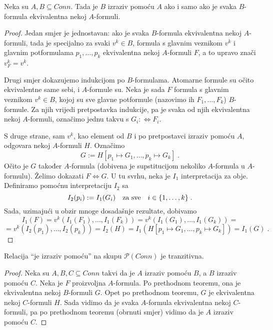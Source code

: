 \begin{teorem}
	Neka su $A, B\subseteq Conn$. Tada je $B$ izraziv pomoću $A$ ako i samo ako je svaka $B$-formula ekvivalentna nekoj $A$-formuli.
\end{teorem}

\begin{proof}
	Jedan smjer je jednostavan: ako je svaka $B$-formula ekvivalentna nekoj $A$-formuli, tada je specijalno za svaki $v^k\in B$, formula s glavnim veznikom $v^k$ i glavnim potformulama $p_1,\ldots,p_k$ ekvivalentna nekoj $A$-formuli $F$, a to upravo znači $v^k_F=v^k$.
	
	Drugi smjer dokazujemo indukcijom po $B$-formulama. Atomarne formule su očito ekvivalentne same sebi, i $A$-formule su. Neka je sada $F$ formula s glavnim veznikom $v^k\in B$, kojoj su sve glavne potformule (nazovimo ih $F_1,\ldots,F_k$) $B$-formule. Za njih vrijedi pretpostavka indukcije, pa je svaka od njih ekvivalentna nekoj $A$-formuli, označimo jednu takvu s $G_i:\Leftrightarrow F_i$.
	
	S druge strane, sam $v^k$, kao element od $B$ i po pretpostavci izraziv pomoću $A$, odgovara nekoj $A$-formuli $H$. Označimo $$G:=H[p_1\mapsto G_1,\ldots,p_k\mapsto G_k]\;.$$
	Očito je $G$ također $A$-formula (dobivena je supstitucijom nekoliko $A$-formula u $A$-formulu). Želimo dokazati $F\Leftrightarrow G$. U tu svrhu, neka je $I_1$ interpretacija za obje. Definiramo pomoćnu interpretaciju $I_2$ sa
	$$I_2(p_i):=I_1(G_i)\mbox{\quad za sve\quad}i\in\{1,\ldots,k\}\;.$$
	Sada, uzimajući u obzir mnoge dosadašnje rezultate, dobivamo
	$$I_1(F)=v^k(I_1(F_1),\ldots,I_1(F_k))=v^k(I_1(G_1),\ldots,I_1(G_k))=$$
	$$=v^k(I_2(p_1),\ldots,I_2(p_k))=I_2(H)=I_1(H[p_1\mapsto G_1,\ldots,p_k\mapsto G_k])=I_1(G)\;.$$
\end{proof}

\begin{korolar}
	Relacija ``je izraziv pomoću'' na skupu $\mathcal P(Conn)$ je tranzitivna.
\end{korolar}

\begin{proof}
	Neka su $A, B, C\subseteq Conn$ takvi da je $A$ izraziv pomoću $B$, a $B$ izraziv pomoću $C$. Neka je $F$ proizvoljna $A$-formula. Po prethodnom teoremu, ona je ekvivalentna nekoj $B$-formuli $G$. Opet po prethodnom teoremu, $G$ je ekvivalentna nekoj $C$-formuli $H$. Sada vidimo da je svaka $A$-formula ekvivalentna nekoj $C$-formuli, pa po prethodnom teoremu (obrnuti smjer) vidimo da je $A$ izraziv pomoću $C$.
\end{proof}

